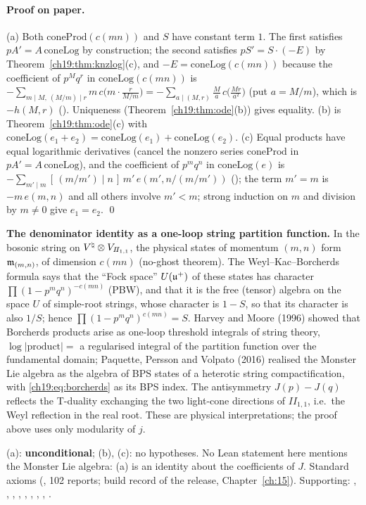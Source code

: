\paragraph{Proof on paper.}  (a) Both $\mathrm{coneProd}(c(mn))$ and $S$ have constant term $1$.  The first satisfies
$pA'=A\,\mathrm{coneLog}$ by construction; the second satisfies $pS'=S\cdot(-E)$ by Theorem~\ref{ch19:thm:knzlog}(c), and
$-E=\mathrm{coneLog}(c(mn))$ because the coefficient of $p^Mq^r$ in $\mathrm{coneLog}(c(mn))$ is
$-\sum_{m\mid M,\ (M/m)\mid r}m\,c\bigl(m\cdot\frac r{M/m}\bigr)=-\sum_{a\mid(M,r)}\frac Ma\,c\bigl(\frac{Mr}{a^2}\bigr)$ (put $a=M/m$),
which is $-h(M,r)$ ().  Uniqueness (Theorem~\ref{ch19:thm:ode}(b)) gives equality.  (b) is
Theorem~\ref{ch19:thm:ode}(c) with $\mathrm{coneLog}(e_1+e_2)=\mathrm{coneLog}(e_1)+\mathrm{coneLog}(e_2)$.  (c) Equal products have
equal logarithmic derivatives (cancel the nonzero series $\mathrm{coneProd}$ in $pA'=A\,\mathrm{coneLog}$), and the coefficient
of $p^mq^n$ in $\mathrm{coneLog}(e)$ is $-\sum_{m'\mid m}[\,(m/m')\mid n\,]\,m'\,e(m',n/(m/m'))$ (); the term
$m'=m$ is $-m\,e(m,n)$ and all others involve $m'<m$; strong induction on $m$ and division by $m\ne0$ give $e_1=e_2$. \qed
\begin{physics}
\textbf{The denominator identity as a one-loop string partition function.}  In the bosonic string on
${V^{\natural}}\otimes V_{I\!I_{1,1}}$, the physical states of momentum $(m,n)$ form $\mathfrak{m}_{(m,n)}$, of dimension $c(mn)$ (no-ghost
theorem).  The Weyl--Kac--Borcherds formula says that the ``Fock space'' $U(\mathfrak{u}^+)$ of these states has character
$\prod(1-p^mq^n)^{-c(mn)}$ (PBW), and that it is the free (tensor) algebra on the space $U$ of simple-root strings, whose
character is $1-S$, so that its character is also $1/S$; hence $\prod(1-p^mq^n)^{c(mn)}=S$.  Harvey and Moore (1996) showed that Borcherds products arise as one-loop
threshold integrals of string theory, $\log|\text{product}|=$ a regularised integral of the partition function over the
fundamental domain; Paquette, Persson and Volpato (2016) realised the Monster Lie algebra as the algebra of BPS states of
a heterotic string compactification, with \eqref{ch19:eq:borcherds} as its BPS index.  The antisymmetry $J(p)-J(q)$
reflects the T-duality exchanging the two light-cone directions of $I\!I_{1,1}$, i.e.\ the Weyl reflection in the real
root.  These are physical interpretations; the proof above uses only modularity of $j$.
\end{physics}
\begin{status}
(a): \textbf{unconditional}; (b), (c): no hypotheses.  No Lean statement here mentions the Monster Lie algebra: (a) is an
identity about the coefficients of $J$.  Standard axioms (, 102 reports;
build record of the release, Chapter~\ref{ch:15}).  Supporting: ,
, , , ,
, , , .
\end{status}

